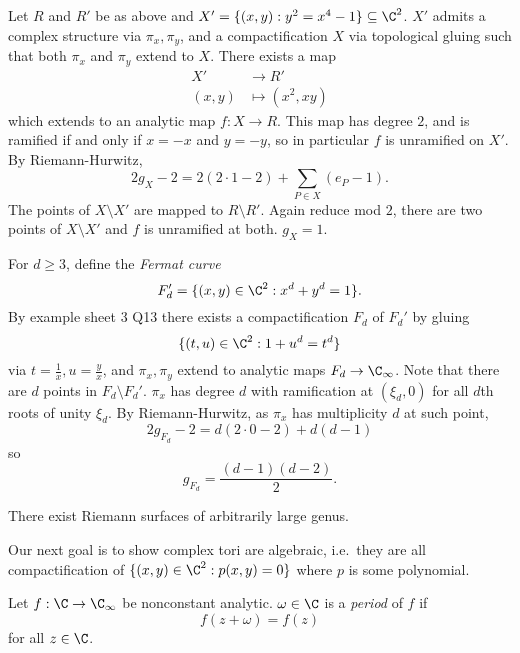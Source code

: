 \documentclass[a4paper]{article}
\begin{document}
\begin{eg}
  Let \(R\) and \(R'\) be as above and \(X' = \{(x, y): y^2 = x^4 - 1\} \subseteq \C^2\). \(X'\) admits a complex structure via \(\pi_x, \pi_y\), and a compactification \(X\) via topological gluing such that both \(\pi_x\) and \(\pi_y\) extend to \(X\). There exists a map
  \begin{align*}
    X' &\to R' \\
    (x, y) &\mapsto (x^2, xy)
  \end{align*}
  which extends to an analytic map \(f: X \to R\). This map has degree \(2\), and is ramified if and only if \(x = -x\) and \(y = -y\), so in particular \(f\) is unramified on \(X'\). By Riemann-Hurwitz,
  \[
    2g_X - 2 = 2(2 \cdot 1 - 2) + \sum_{P \in X} (e_P - 1).
  \]
  The points of \(X \setminus X'\) are mapped to \(R \setminus R'\). Again reduce mod \(2\), there are two points of \(X \setminus X'\) and \(f\) is unramified at both. \(g_X = 1\).
\end{eg}

\begin{eg}
  For \(d \geq 3\), define the \emph{Fermat curve}
  \[
    F_d' = \{(x, y) \in \C^2: x^d + y^d = 1\}.
  \]
  By example sheet 3 Q13 there exists a compactification \(F_d\) of \(F_d'\) by gluing
  \[
    \{(t, u) \in \C^2: 1+ u^d = t^d\}
  \]
  via \(t = \frac{1}{x}, u = \frac{y}{x}\), and \(\pi_x, \pi_y\) extend to analytic maps \(F_d \to \C_\infty\). Note that there are \(d\) points in \(F_d \setminus F_d'\). \(\pi_x\) has degree \(d\) with ramification at \((\xi_d, 0)\) for all \(d\)th roots of unity \(\xi_d\). By Riemann-Hurwitz, as \(\pi_x\) has multiplicity \(d\) at such point,
\[
  2g_{F_d} - 2 = d(2 \cdot 0 - 2) + d(d - 1)
\]
so
\[
  g_{F_d} = \frac{(d - 1)(d - 2)}{2}.
\]
\end{eg}

\begin{corollary}
  There exist Riemann surfaces of arbitrarily large genus.
\end{corollary}

Our next goal is to show complex tori are algebraic, i.e.\ they are all compactification of \(\{(x, y) \in \C^2: p(x, y) = 0\}\) where \(p\) is some polynomial.

\begin{definition}[period]
  Let \(f: \C \to \C_\infty\) be nonconstant analytic. \(\omega \in \C\) is a \emph{period} of \(f\) if
  \[
    f(z + \omega) = f(z)
  \]
  for all \(z \in \C\).
\end{definition}
\end{document}
